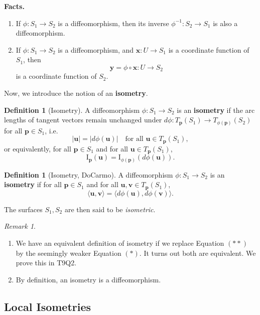 \documentclass[10pt, a4paper]{article}
\theoremstyle{plain}
\theoremstyle{definition}
\newtheorem{definition}[theorem]{Definition}
\theoremstyle{remark}
\newtheorem{remark}[theorem]{Remark}
\begin{document}
\textbf{Facts.}
\begin{enumerate}
  \item If $\phi: S_1 \to S_2$ is a diffeomorphism, then its inverse $\phi^{-1}: S_2 \to S_1$ is also a diffeomorphism.
  \item If $\phi: S_1 \to S_2$ is a diffeomorphism, and $\mathbf{x}: U \to S_1$ is a coordinate function of $S_1$, then
  \[
    \mathbf{y} = \phi \circ \mathbf{x} : U \to S_2
  \]
  is a coordinate function of $S_2$.
\end{enumerate}

Now, we introduce the notion of an \textbf{isometry}.

\begin{definition}[Isometry]\label{def:isometry}
  A diffeomorphism $\phi: S_1 \to S_2$ is an \textbf{isometry} if the arc lengths of tangent
  vectors remain unchanged under $d\phi: T_{\mathbf{p}}(S_1) \to T_{\phi(\mathbf{p})}(S_2)$
  for all $\mathbf{p} \in S_1$, i.e.
  \[
    |\mathbf{u}| = |d\phi(\mathbf{u})| \quad \text{for all } \mathbf{u} \in T_{\mathbf{p}}(S_1),
  \]
  or equivalently, for all $\mathbf{p} \in S_1$ and for all $\mathbf{u} \in T_{\mathbf{p}}(S_1)$,
  \[
    \mathrm{I}_{\mathbf{p}}(\mathbf{u}) = \mathrm{I}_{\phi(\mathbf{p})}(d\phi(\mathbf{u})). \tag{$*$}
  \]
\end{definition}

\begin{definition}[Isometry, DoCarmo]
  A diffeomorphism $\phi: S_1 \to S_2$ is an \textbf{isometry} if for all $\mathbf{p} \in S_1$
  and for all $\mathbf{u}, \mathbf{v} \in T_{\mathbf{p}}(S_1)$,
  \[
    \langle \mathbf{u}, \mathbf{v} \rangle = \langle d\phi(\mathbf{u}), d\phi(\mathbf{v}) \rangle. \tag{$**$}
  \]
\end{definition}

The surfaces $S_1, S_2$ are then said to be \emph{isometric}.

\begin{remark}
\begin{enumerate}
  \item We have an equivalent definition of isometry if we replace Equation $(**)$ by the
  seemingly weaker Equation $(*)$. It turns out both are equivalent. We prove this in T9Q2.
  \item By definition, an isometry is a diffeomorphism.
\end{enumerate}
\end{remark}

\pagebreak
\subsection{Local Isometries}
\end{document}
